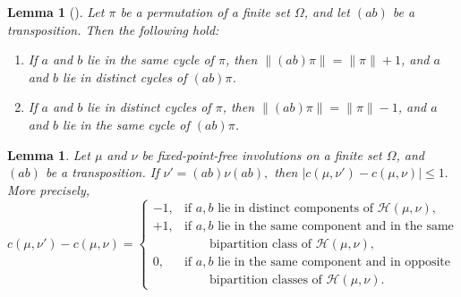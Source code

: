 \documentclass[12pt]{article}
\newtheorem{lemma}[theorem]{Lemma}
\theoremstyle{definition}
\begin{document}
\begin{lemma}[\cite{Stahl1987}] \label{lem2:10}
Let $\pi$ be a permutation of a finite set $\Omega$, and let $(ab)$ be a transposition. Then the following hold:
\begin{enumerate}
    \item If $a$ and $b$ lie in the same cycle of $\pi$, then $\lVert (ab)\pi\rVert=\lVert \pi\rVert+1$, and $a$ and $b$ lie in distinct cycles of $(ab)\pi$.
    \item If $a$ and $b$ lie in distinct cycles of $\pi$, then $\lVert (ab)\pi\rVert=\lVert \pi\rVert-1$, and $a$ and $b$ lie in the same cycle of $(ab)\pi$.
\end{enumerate}
\end{lemma}


\begin{lemma}
\label{lem2:11}
Let $\mu$ and $\nu$ be fixed-point-free involutions on a finite set
$\Omega$, and $(ab)$ be a transposition. If $\nu'=(ab)\nu (ab),$ then $|c(\mu,\nu')-c(\mu,\nu)|\le 1.$
More precisely,
\[
c(\mu,\nu')-c(\mu,\nu)=
\begin{cases}
-1, & \text{if $a,b$ lie in distinct components of }
       \mathcal H(\mu,\nu),\\
+1, & \text{if $a,b$ lie in the same component and in the same}\\
    & \qquad \text{bipartition class of }\mathcal H(\mu,\nu),\\
0,  & \text{if $a,b$ lie in the same component and in opposite}\\
    & \qquad \text{bipartition classes of }\mathcal H(\mu,\nu).
\end{cases}\]
\end{lemma}
\end{document}
